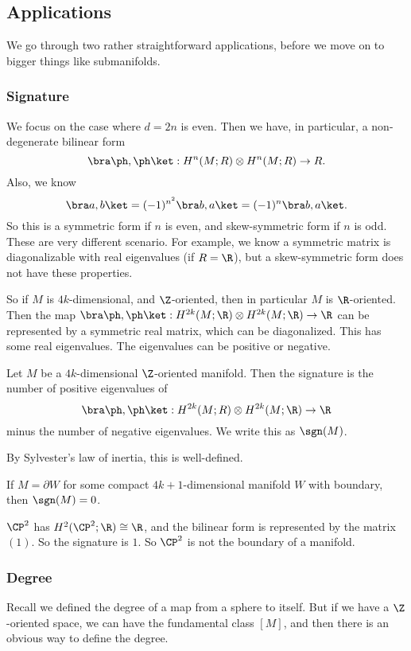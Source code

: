 \documentclass[a4paper]{article}
\theoremstyle{definition}
\begin{document}
\subsection{Applications}
We go through two rather straightforward applications, before we move on to bigger things like submanifolds.

\subsubsection*{Signature}
We focus on the case where $d = 2n$ is even. Then we have, in particular, a non-degenerate bilinear form
\[
  \bra \ph, \ph\ket : H^n(M; R) \otimes H^n(M; R) \to R.
\]
Also, we know
\[
  \bra a, b\ket = (-1)^{n^2}\bra b, a\ket = (-1)^n \bra b, a \ket.
\]
So this is a symmetric form if $n$ is even, and skew-symmetric form if $n$ is odd. These are very different scenario. For example, we know a symmetric matrix is diagonalizable with real eigenvalues (if $R = \R$), but a skew-symmetric form does not have these properties.

So if $M$ is $4k$-dimensional, and $\Z$-oriented, then in particular $M$ is $\R$-oriented. Then the map $\bra \ph, \ph\ket : H^{2k}(M; \R) \otimes H^{2k}(M; \R) \to \R$ can be represented by a symmetric real matrix, which can be diagonalized. This has some real eigenvalues. The eigenvalues can be positive or negative.
\begin{defi}
  Let $M$ be a $4k$-dimensional $\Z$-oriented manifold. Then the signature is the number of positive eigenvalues of
  \[
    \bra \ph, \ph\ket: H^{2k}(M; R) \otimes H^{2k}(M; \R) \to \R
  \]
  minus the number of negative eigenvalues. We write this as $\sgn(M)$.
\end{defi}
By Sylvester's law of inertia, this is well-defined.

\begin{fact}
  If $M = \partial W$ for some compact $4k + 1$-dimensional manifold $W$ with boundary, then $\sgn(M) = 0$.
\end{fact}

\begin{eg}
  $\CP^2$ has $H^2(\CP^2; \R) \cong \R$, and the bilinear form is represented by the matrix $(1)$. So the signature is $1$. So $\CP^2$ is not the boundary of a manifold.
\end{eg}

\subsubsection*{Degree}
Recall we defined the degree of a map from a sphere to itself. But if we have a $\Z$-oriented space, we can have the fundamental class $[M]$, and then there is an obvious way to define the degree.
\end{document}

